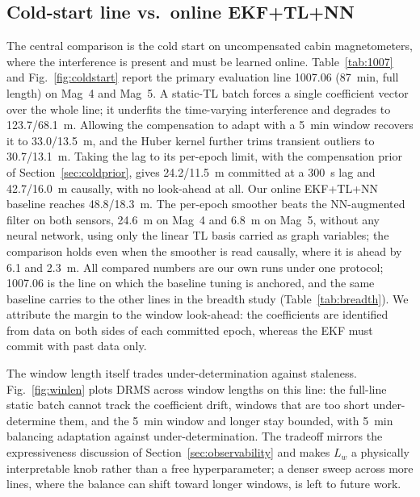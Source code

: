 \documentclass{IEEEtaes}
\begin{document}
\subsection{Cold-start line vs.\ online EKF+TL+NN}
The central comparison is the cold start on uncompensated cabin magnetometers,
where the interference is present and must be learned online. Table~\ref{tab:1007}
and Fig.~\ref{fig:coldstart} report the primary evaluation line 1007.06
(\SI{87}{\minute}, full length) on Mag~4 and Mag~5. A static-TL batch forces a
single coefficient vector over the whole line; it underfits the time-varying
interference and degrades to \num{123.7}/\SI{68.1}{\meter}. Allowing the
compensation to adapt with a \SI{5}{\minute} window recovers it to
\num{33.0}/\SI{13.5}{\meter}, and the Huber kernel further trims transient outliers
to \num{30.7}/\SI{13.1}{\meter}. Taking the lag to its per-epoch limit, with the
compensation prior of Section~\ref{sec:coldprior}, gives
\num{24.2}/\SI{11.5}{\meter} committed at a \SI{300}{\second} lag and
\num{42.7}/\SI{16.0}{\meter} causally, with no look-ahead at all. Our online
EKF+TL+NN baseline reaches \num{48.8}/\SI{18.3}{\meter}. The per-epoch smoother
beats the NN-augmented filter on both sensors, \SI{24.6}{\meter} on Mag~4 and
\SI{6.8}{\meter} on Mag~5, without any neural network, using only the linear TL
basis carried as graph variables; the comparison holds even when the smoother is
read causally, where it is ahead by \SI{6.1}{} and \SI{2.3}{\meter}. All compared numbers are our own runs under one
protocol; 1007.06 is the line on which the baseline tuning is anchored, and the
same baseline carries to the other lines in the breadth study
(Table~\ref{tab:breadth}). We attribute the
margin to the window look-ahead: the coefficients are identified from data on both
sides of each committed epoch, whereas the EKF must commit with past data only.

The window length itself trades under-determination against staleness.
Fig.~\ref{fig:winlen} plots DRMS across window lengths on this line: the full-line
static batch cannot track the coefficient drift, windows that are too short
under-determine them, and the \SI{5}{\minute} window and longer stay bounded, with
\SI{5}{\minute} balancing adaptation against under-determination. The tradeoff
mirrors the expressiveness discussion of
Section~\ref{sec:observability} and makes $L_w$ a physically interpretable knob
rather than a free hyperparameter; a denser sweep across more lines, where the
balance can shift toward longer windows, is left to future work.
\end{document}
